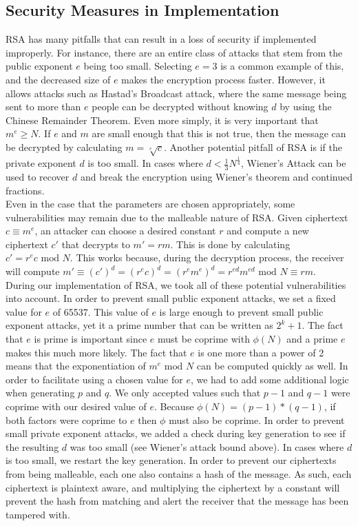 	\subsection{Security Measures in Implementation}\label{sec:rsa-security}
		RSA has many pitfalls that can result in a loss of security if implemented improperly. For instance, there are an entire class of attacks that stem from the public exponent $e$ being
		too small. Selecting $e=3$ is a common example of this, and the decreased size of $e$ makes the encryption process faster. However, it allows attacks such as Hastad's Broadcast attack,
		where the same message being sent to more than $e$ people can be decrypted without knowing $d$ by using the Chinese Remainder Theorem. Even more simply, it is very important that
		$m^e\ge N$. If $e$ and $m$ are small enough that this is not true, then the message can be decrypted by calculating $m=\sqrt[e]c$. Another potential pitfall of RSA is if the private 
		exponent $d$ is too small. In cases where $d < \frac13N^{\frac14}$, Wiener's Attack can be used to recover $d$ and break the encryption using Wiener's theorem and continued fractions.\\

		Even in the case that the parameters are chosen appropriately, some vulnerabilities may remain due to the malleable nature of RSA. Given ciphertext $c\equiv m^e$, an attacker can choose
		a desired constant $r$ and compute a new ciphertext $c'$ that decrypts to $m'=rm$. This is done by calculating $c'=r^ec\text{ mod }N$. This works because, during the decryption process,
		the receiver will compute $m'\equiv (c')^d=(r^ec)^d=(r^em^e)^d=r^{ed}m^{ed}\text{ mod }N\equiv rm$.\\

		During our implementation of RSA, we took all of these potential vulnerabilities into account. In order to prevent small public exponent attacks, we set a fixed value for $e$ of 65537.
		This value of $e$ is large enough to prevent small public exponent attacks, yet it a prime number that can be written as $2^k+1$. The fact that $e$ is prime is important since $e$ must
		be coprime with $\phi(N)$ and a prime $e$ makes this much more likely. The fact that $e$ is one more than a power of 2 means that the exponentiation of $m^e\text{ mod }N$ can be
		computed quickly as well. In order to facilitate using a chosen value for $e$, we had to add some additional logic when generating $p$ and $q$. We only accepted values such that $p-1$ and
		$q-1$ were coprime with our desired value of $e$. Because $\phi(N)=(p-1)*(q-1)$, if both factors were coprime to $e$ then $\phi$ must also be coprime. In order to prevent small private
		exponent attacks, we added a check during key generation to see if the resulting $d$ was too small (see Wiener's attack bound above). In cases where $d$ is too small, we restart the key
		generation. In order to prevent our ciphertexts from being malleable, each one also contains a hash of the message. As such, each ciphertext is plaintext aware, and multiplying the
		ciphertext by a constant will prevent the hash from matching and alert the receiver that the message has been tampered with.
